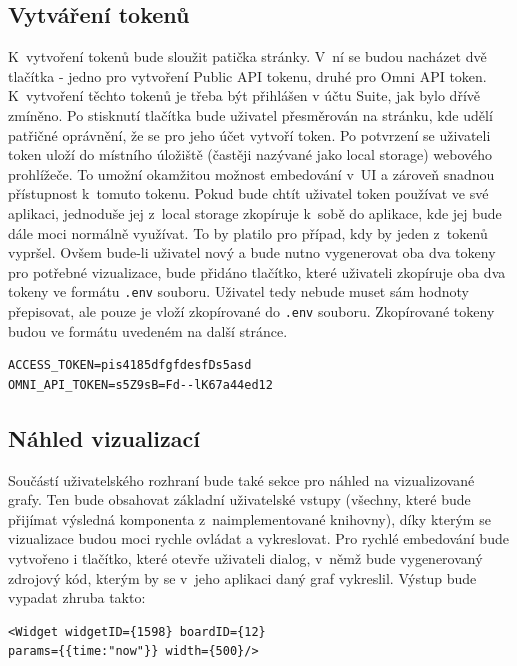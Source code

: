 \documentclass[czech, bc, kiv, he, iso690numb, viewonly]{fasthesis} %
\begin{document}
\subsection{Vytváření tokenů}

K~vytvoření tokenů bude sloužit patička stránky. V~ní se budou nacházet dvě tlačítka - jedno pro vytvoření Public API tokenu, druhé pro Omni API token. K~vytvoření těchto tokenů je třeba být přihlášen v
účtu Suite, jak bylo dřívě zmíněno. Po stisknutí tlačítka bude uživatel přesměrován na stránku, kde udělí patřičné oprávnění, že se pro jeho účet vytvoří token. Po potvrzení se uživateli token uloží
do místního úložiště (častěji nazývané jako local storage) webového prohlížeče. To umožní okamžitou možnost embedování v~UI a zároveň snadnou přístupnost k~tomuto tokenu. Pokud bude chtít uživatel token používat ve své aplikaci, jednoduše jej z~local storage
zkopíruje k~sobě do aplikace, kde jej bude dále moci normálně využívat. To by platilo pro případ, kdy by jeden z~tokenů vypršel. Ovšem bude-li uživatel nový a bude nutno vygenerovat oba dva tokeny pro potřebné vizualizace,
bude přidáno tlačítko, které uživateli zkopíruje oba dva tokeny ve formátu \texttt{.env} souboru. Uživatel tedy nebude muset sám hodnoty přepisovat, ale pouze je vloží zkopírované do \texttt{.env} souboru. Zkopírované tokeny
budou ve formátu uvedeném na další stránce.
\lstset{style=plainsrc}
\begin{lstlisting}
ACCESS_TOKEN=pis4185dfgfdesfDs5asd
OMNI_API_TOKEN=s5Z9sB=Fd--lK67a44ed12
\end{lstlisting}

\subsection{Náhled vizualizací}
Součástí uživatelského rozhraní bude také sekce pro náhled na vizualizované grafy. Ten bude obsahovat základní uživatelské vstupy (všechny, které bude přijímat výsledná komponenta z~naimplementované knihovny), 
díky kterým se vizualizace budou moci rychle ovládat a vykreslovat. Pro rychlé embedování bude vytvořeno i tlačítko, které otevře uživateli dialog, v~němž bude vygenerovaný zdrojový kód, kterým by se
v~jeho aplikaci daný graf vykreslil. Výstup bude vypadat zhruba takto:

\lstset{style=plainsrc}
\begin{lstlisting}
<Widget widgetID={1598} boardID={12} 
params={{time:"now"}} width={500}/>
\end{lstlisting}
\end{document}
